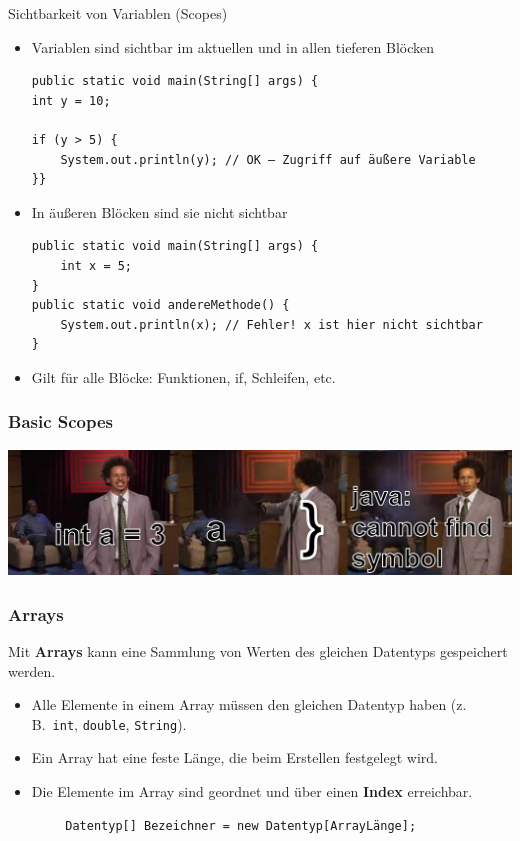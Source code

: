 \documentclass{../../presentation}
\begin{document}
\begin{frame}[fragile]{Sichtbarkeit von Variablen (Scopes)}
	\begin{itemize}
		\item\pause Variablen sind sichtbar im aktuellen und in allen tieferen Blöcken
		      \begin{verbatim}
public static void main(String[] args) {
int y = 10;

if (y > 5) {
    System.out.println(y); // OK – Zugriff auf äußere Variable
}}
    \end{verbatim}
		\item\pause In äußeren Blöcken sind sie nicht sichtbar
		      \begin{verbatim}
public static void main(String[] args) {
    int x = 5;
}
public static void andereMethode() {
    System.out.println(x); // Fehler! x ist hier nicht sichtbar
}
    \end{verbatim}

		\item\pause Gilt für alle Blöcke: Funktionen, if, Schleifen, etc.
	\end{itemize}
\end{frame}


\begin{frame}[fragile]
	\frametitle{Basic Scopes}
	\includegraphics[width=1\linewidth]{img/scopesmemehoriz.png}
\end{frame}


\begin{frame}[fragile]
	\frametitle{Arrays}
	Mit \textbf{Arrays} kann eine Sammlung von Werten des gleichen Datentyps gespeichert werden.
	\begin{itemize}
		\item Alle Elemente in einem Array müssen den gleichen Datentyp haben (z.\,B.\ \texttt{int}, \texttt{double}, \texttt{String}).
		\item Ein Array hat eine feste Länge, die beim Erstellen festgelegt wird.
		\item Die Elemente im Array sind geordnet und über einen \textbf{Index} erreichbar.
	\end{itemize}
	\begin{verbatim}
        Datentyp[] Bezeichner = new Datentyp[ArrayLänge];
    \end{verbatim}
\end{frame}
\end{document}
